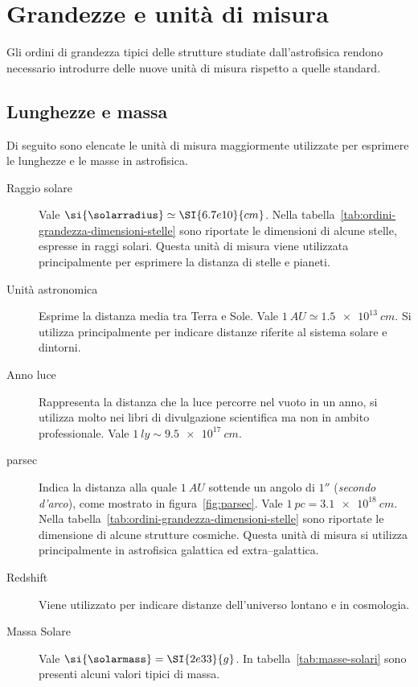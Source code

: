 \section{Grandezze e unità di misura}\label{sec:unita-di-misura}
Gli ordini di grandezza tipici delle strutture studiate dall'astrofisica rendono necessario introdurre delle nuove unità di misura rispetto a quelle standard.

\subsection{Lunghezze e massa}
Di seguito sono elencate le unità di misura maggiormente utilizzate per esprimere le lunghezze e le masse in astrofisica.
\begin{description}
    \item[Raggio solare] Vale $\si{\solarradius} \simeq \SI{6.7e10}{cm}$. Nella tabella~\ref{tab:ordini-grandezza-dimensioni-stelle} sono riportate le dimensioni di alcune stelle, espresse in raggi solari. Questa unità di misura viene utilizzata principalmente per esprimere la distanza di stelle e pianeti.
    \item[Unità astronomica] Esprime la distanza media tra Terra e Sole. Vale $\SI{1}{AU} \simeq \SI{1.5e13}{cm}$. Si utilizza principalmente per indicare distanze riferite al sistema solare e dintorni.
    \item[Anno luce] Rappresenta la distanza che la luce percorre nel vuoto in un anno, si utilizza molto nei libri di divulgazione scientifica ma non in ambito professionale. Vale $\SI{1}{ly} \sim \SI{9.5e17}{cm}$.
    \item[parsec] Indica la distanza alla quale $\SI{1}{AU}$ sottende un angolo di $\ang{;;1}$ (\emph{secondo d'arco}), come mostrato in figura~\ref{fig:parsec}. Vale $\SI{1}{pc} = \SI{3.1e18}{cm}$. Nella tabella~\ref{tab:ordini-grandezza-dimensioni-stelle} sono riportate le dimensione di alcune strutture cosmiche. Questa unità di misura si utilizza principalmente in astrofisica galattica ed extra--galattica.
    \item[Redshift] Viene utilizzato per indicare distanze dell'universo lontano e in cosmologia.
    \item[Massa Solare] Vale $\si{\solarmass} = \SI{2e33}{g}$. In tabella~\ref{tab:masse-solari} sono presenti alcuni valori tipici di massa.
\end{description}

